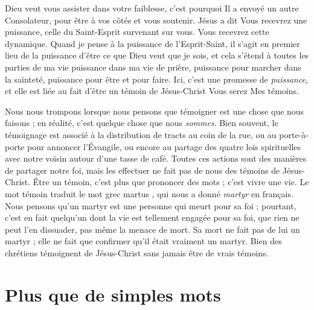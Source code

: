 Dieu veut vous assister dans votre faiblesse,
 c'est pourquoi Il a envoyé un autre Consolateur,
 pour être à vos côtés et vous soutenir. Jésus a dit\frcolon{}
 \Og Vous recevrez une puissance,
 celle du Saint-Esprit survenant sur vous. \Fg{}
 Vous recevrez cette dynamique. Quand je pense à la puissance
 de l'Esprit-Saint, il s'agit en premier lieu de
 la puissance d'être ce que Dieu
 veut que je sois, et cela s'étend à toutes les parties de ma vie\frcolon{}
 puissance dans ma vie de prière, puissance pour marcher
 dans la sainteté, puissance pour être et pour faire.
 Ici, c'est une promesse de \emph{puissance}, et elle est liée au fait
 d'être un témoin de Jésus-Christ\frcolon{} \Og Vous serez Mes témoins. \Fg{}

Nous nous trompons lorsque nous pensons que témoigner
 est une chose que nous faisons ;
 en réalité, c'est quelque chose que nous \emph{som\-mes}.
 Bien souvent, le témoignage est associé à la distribution de tracts
 au coin de la rue, ou au porte-à-porte pour annoncer l'Évangile,
 ou encore au partage des quatre lois spirituelles avec notre voisin
 autour d'une tasse de café.
 Toutes ces actions sont des manières de partager notre foi,
 mais les effectuer ne fait pas de nous des témoins de Jésus-Christ.
 Être un témoin, c'est plus que prononcer des mots ; c'est vivre une vie.
 Le mot \Og témoin \Fg{} traduit le mot grec \Og martus \Fg{},
 qui nous a donné \emph{martyr} en français.
 Nous pensons qu'un martyr est une personne qui meurt pour sa foi ;
 pourtant, c'est en fait quelqu'un dont la vie est tellement engagée
 pour sa foi, que rien ne peut l'en dissuader, pas même la menace de mort.
 Sa mort ne fait pas de lui un martyr ; elle ne fait que confirmer
 qu'il était vraiment un martyr.
 Bien des chrétiens témoignent de Jésus-Christ
 sans jamais être de vrais témoins.

\section{Plus que de simples mots}

